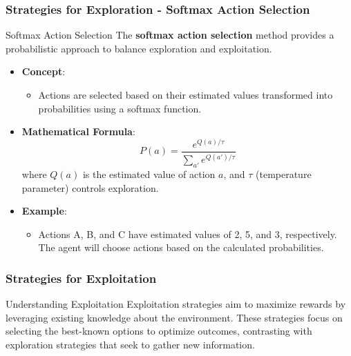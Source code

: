 \documentclass[aspectratio=169]{beamer}
\begin{document}
\begin{frame}[fragile]
    \frametitle{Strategies for Exploration - Softmax Action Selection}
    \begin{block}{Softmax Action Selection}
        The \textbf{softmax action selection} method provides a probabilistic approach to balance exploration and exploitation.
    \end{block}
    \begin{itemize}
        \item \textbf{Concept}:
        \begin{itemize}
            \item Actions are selected based on their estimated values transformed into probabilities using a softmax function.
        \end{itemize}
        \item \textbf{Mathematical Formula}:
        \begin{equation}
            P(a) = \frac{e^{Q(a)/\tau}}{\sum_{a'} e^{Q(a')/\tau}}
        \end{equation}
        where $Q(a)$ is the estimated value of action $a$, and $\tau$ (temperature parameter) controls exploration.
        \item \textbf{Example}:
        \begin{itemize}
            \item Actions A, B, and C have estimated values of 2, 5, and 3, respectively. The agent will choose actions based on the calculated probabilities.
        \end{itemize}
    \end{itemize}
\end{frame}

\begin{frame}[fragile]
    \frametitle{Strategies for Exploitation}
    \begin{block}{Understanding Exploitation}
        Exploitation strategies aim to maximize rewards by leveraging existing knowledge about the environment. These strategies focus on selecting the best-known options to optimize outcomes, contrasting with exploration strategies that seek to gather new information.
    \end{block}
\end{frame}
\end{document}
